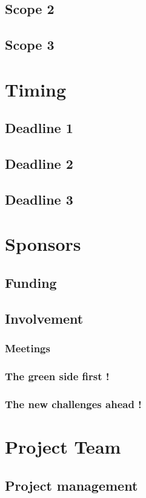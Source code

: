 \documentclass[8pt]{article} %
\begin{document}
\subsection{Scope 2}
\subsection{Scope 3}

\section{Timing}
\subsection{Deadline 1}
\subsection{Deadline 2}
\subsection{Deadline 3}

\section{Sponsors}
\subsection{Funding}
\subsection{Involvement}
\subsubsection{Meetings}
\subsubsection{The green side first !}
\subsubsection{The new challenges ahead !}

\section{Project Team}
\subsection{Project management}
\end{document}
